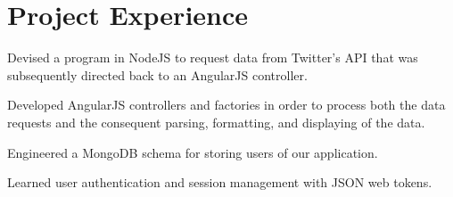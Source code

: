 \documentclass[letterpaper]{deedy-resume}
\begin{document}
\begin{minipage}[t]{0.66\textwidth}
\section{Project Experience}


\begin{tightitemize}
\item Devised a program in NodeJS to request data from Twitter's API that was subsequently directed back to an AngularJS controller.
\item Developed AngularJS controllers and factories in order to process both the data requests and the consequent parsing, formatting, and displaying of the data.
\item Engineered a MongoDB schema for storing users of our application.
\item Learned user authentication and session management with JSON web tokens.
\end{tightitemize}
\sectionspace %


\end{minipage}
\end{document}
